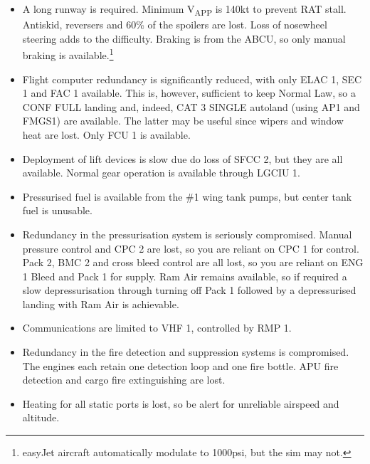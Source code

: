 \documentclass[a5paper,11pt,twoside]{book}
\newcommand{\multicite}[1]{
  \nopagebreak
  \noindent{\footnotesize\color{blue}{[ #1 ]}}
}
\newcommand{\V}[1]{V\textsubscript{#1}}
\begin{document}
\begin{itemize}

\item A long runway is required. Minimum \V{APP} is 140kt to prevent RAT
  stall. Antiskid, reversers and 60\% of the spoilers are lost. Loss of
  nosewheel steering adds to the difficulty. Braking is from the ABCU, so only
  manual braking is available.\footnote{easyJet aircraft automatically modulate
  to 1000psi, but the sim may not.}

  \item Flight computer redundancy is significantly reduced, with only ELAC 1,
    SEC 1 and FAC 1 available. This is, however, sufficient to keep Normal Law,
    so a CONF FULL landing and, indeed, CAT 3 SINGLE autoland (using AP1 and
    FMGS1) are available. The latter may be useful since wipers and window heat
    are lost. Only FCU 1 is available.

  \item Deployment of lift devices is slow due do loss of SFCC 2, but they are
    all available. Normal gear operation is available through LGCIU 1.

  \item Pressurised fuel is available from the \#1 wing tank pumps, but center
    tank fuel is unusable.

  \item Redundancy in the pressurisation system is seriously compromised. Manual
    pressure control and CPC 2 are lost, so you are reliant on CPC 1 for
    control. Pack 2, BMC 2 and cross bleed control are all lost, so you are
    reliant on ENG 1 Bleed and Pack 1 for supply. Ram Air remains available, so
    if required a slow depressurisation through turning off Pack 1 followed by a
    depressurised landing with Ram Air is achievable.

  \item Communications are limited to VHF 1, controlled by RMP 1.

  \item Redundancy in the fire detection and suppression systems is
    compromised. The engines each retain one detection loop and one fire
    bottle. APU fire detection and cargo fire extinguishing are lost.

  \item Heating for all static ports is lost, so be alert for unreliable
    airspeed and altitude.
\end{itemize}

\multicite{\uline{ELEC}~DC~EMER~CONFIG, FCOM~PRO.AEP.ELEC}
\end{document}

